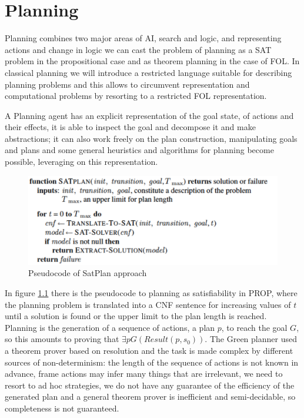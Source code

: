 \chapter{Planning}
Planning combines two major areas of AI, search and logic, and representing actions and change in
logic we can cast the problem of planning as a SAT problem in the propositional case and as 
theorem planning in the case of FOL.\newline
In classical planning we will introduce a restricted language suitable for describing planning
problems and this allows to circumvent representation and computational problems by 
resorting to a restricted FOL representation.

A Planning agent has an explicit representation of the goal state, of actions and their effects,
it is able to inspect the goal and decompose it and make abstractions; it can also work freely
on the plan construction, manipulating goals and plans and some general heuristics and algorithms
for planning become possible, leveraging on this representation.

\begin{figure}
	\includegraphics[width=\textwidth]{Images/satPlan}
	\caption{Pseudocode of SatPlan approach}
	\label{img:satPlan}
\end{figure}
In figure \ref{img:satPlan} there is the pseudocode to planning as satisfiability in PROP, where
the planning problem is translated into a CNF sentence for increasing values of $t$ until a 
solution is found or the upper limit to the plan length is reached.\newline
Planning is the generation of a sequence of actions, a plan $p$, to reach the goal $G$, so
this amounts to proving that $\exists p G(Result(p, s_0))$.\newline
The Green planner used a theorem prover based on resolution and the task is made complex by 
different sources of non-determinism: the length of the sequence of actions is not known in 
advance, frame actions may infer many things that are irrelevant, we need to resort to ad hoc
strategies, we do not have any guarantee of the efficiency of the generated plan and 
a general theorem prover is inefficient and semi-decidable, so completeness is not guaranteed.

